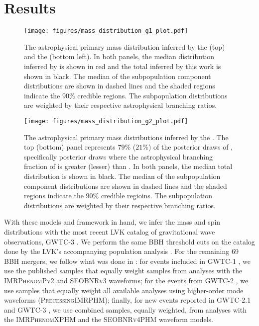 \section{Results} \label{sec:results}

\begin{figure*}[ht!]
    \begin{centering}
        \texttt{[image: figures/mass\_distribution\_g1\_plot.pdf]}
        \caption{The astrophysical primary mass distribution inferred by the \base{} (top) and the \comp{} (bottom left). In both panels, the median distribution inferred by \brucepaper is shown in red and the total inferred by this work is shown in black. The median of the subpopulation component distributions are shown in dashed lines and the shaded regions indicate the $90\%$ credible regions. The subpopulation distributions are weighted by their respective astrophysical branching ratios.}
        \label{fig:g1_mass_distribution}
    \end{centering}
\end{figure*}

\begin{figure*}[ht!]
    \begin{centering}
        \texttt{[image: figures/mass\_distribution\_g2\_plot.pdf]}
        \caption{The astrophysical primary mass distributions inferred by the \comp{}. The top (bottom) panel represents $79\%$ ($21\%$) of the posterior draws of \comp{}, specifically posterior draws where the astrophysical branching fraction of \contA{} is greater (lesser) than \contB{}. In both panels, the median total distribution is shown in black. The median of the subpopulation component distributions are shown in dashed lines and the shaded regions indicate the $90\%$ credible regioins. The subpopulation distributions are weighted by their respective branching ratios.}
        \label{fig:g2_mass_distribution}
    \end{centering}
\end{figure*}

With these models and framework in hand, we infer the mass and spin distributions with the most recent LVK catalog of gravitational wave observations, GWTC-3 \citep{2021arXiv211103606T}. We perform the same BBH threshold cuts on the catalog done by the LVK's accompanying population analysis \othreea{}. For the remaining 69 BBH mergers, we follow what was done in \citet{2021arXiv211103606T}: for events included in GWTC-1 \citep{2019ApJ...882L..24A}, we use the published samples that equally weight samples from analyses with the \textsc{IMRPhenomPv2} \citep{1308.3271} and \textsc{SEOBNRv3} \citep{1307.6232,1311.2544} waveforms; for the events from GWTC-2 \citep{2021ApJ...913L...7A}, we use samples that equally weight all available analyses using higher-order mode waveforms (\textsc{PrecessingIMRPHM}); finally, for new events reported in GWTC-2.1 and GWTC-3 \citep{2021arXiv211103606T,2108.01045}, we use combined samples, equally weighted, from analyses with the \textsc{IMRPhenomXPHM} \citep{2004.06503} and the \textsc{SEOBNRv4PHM} \citep{2004.09442} waveform models.

